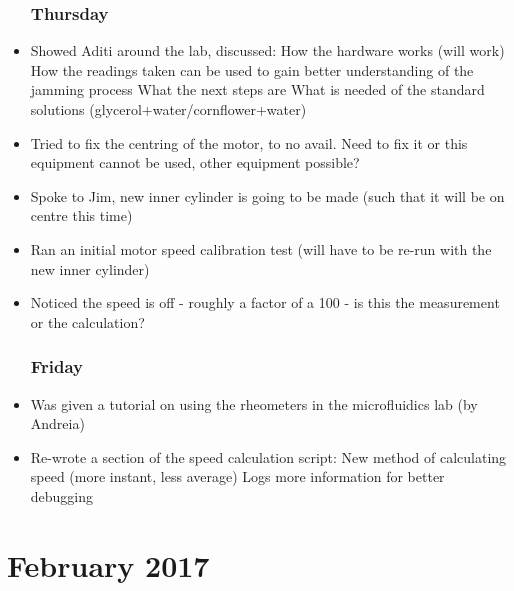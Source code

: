 \documentclass[a4]{report}
\begin{document}
\begin{itemize}
		\subsection*{Thursday}
		\item Showed Aditi around the lab, discussed:
		\subitem How the hardware works (will work)
		\subitem How the readings taken can be used to gain better understanding of the jamming process
		\subitem What the next steps are
		\subitem What is needed of the standard solutions (glycerol+water/cornflower+water)
		\item Tried to fix the centring of the motor, to no avail. Need to fix it or this equipment cannot be used, other equipment possible?
		\item Spoke to Jim, new inner cylinder is going to be made (such that it will be on centre this time)
		\item Ran an initial motor speed calibration test (will have to be re-run with the new inner cylinder)
		\item Noticed the speed is off - roughly a factor of a 100 - is this the measurement or the calculation?
		\subsection*{Friday}
		\item Was given a tutorial on using the rheometers in the microfluidics lab (by Andreia)
		\item Re-wrote a section of the speed calculation script:
		\subitem New method of calculating speed (more instant, less average)
		\subitem Logs more information for better debugging
	\end{itemize}
	\chapter{February 2017}
\end{document}
